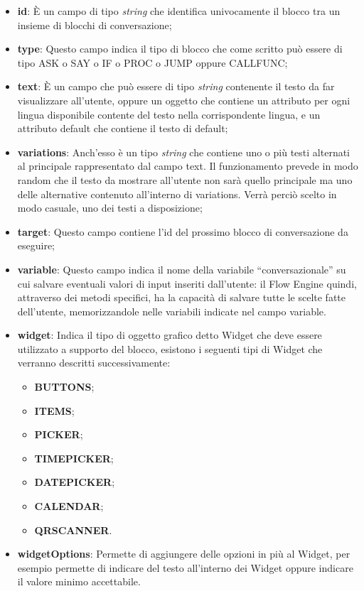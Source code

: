 \begin{itemize}
	\item \textbf{id}: È un campo di tipo \emph{string} che identifica univocamente il blocco tra un insieme di blocchi di conversazione;
	\item \textbf{type}: Questo campo indica il tipo di blocco che come scritto può essere di tipo ASK o SAY o IF o PROC o JUMP oppure CALLFUNC;        
	\item \textbf{text}: È un campo che può essere di tipo \emph{string} contenente il testo da far visualizzare all'utente, oppure un oggetto che contiene un attributo per ogni lingua disponibile contente del testo nella corrispondente lingua, e un attributo default che contiene il testo di default;
	\item \textbf{variations}: Anch'esso è un tipo \emph{string} che contiene uno o più testi alternati al principale rappresentato dal campo text. Il funzionamento prevede in modo random che il testo da mostrare all'utente non sarà quello principale ma uno delle alternative contenuto all'interno di variations. Verrà perciò scelto in modo casuale, uno dei testi a disposizione; 
	\item \textbf{target}: Questo campo contiene l'id del prossimo blocco di conversazione da eseguire;
	\item \textbf{variable}: Questo campo indica il nome della variabile “conversazionale” su cui salvare eventuali valori di input inseriti dall’utente: il Flow Engine quindi, attraverso dei metodi specifici, ha la capacità di salvare tutte le scelte fatte dell’utente, memorizzandole nelle variabili indicate nel campo variable.
	\item \textbf{widget}: Indica il tipo di oggetto grafico detto Widget che deve essere utilizzato a supporto del blocco, esistono i seguenti tipi di Widget che verranno descritti successivamente:
	\begin{itemize}
		\item \textbf{BUTTONS};
		\item \textbf{ITEMS};
		\item \textbf{PICKER};
		\item \textbf{TIMEPICKER};
		\item \textbf{DATEPICKER};
		\item \textbf{CALENDAR};
		\item \textbf{QRSCANNER}.
	\end{itemize}
	\item \textbf{widgetOptions}: Permette di aggiungere delle opzioni in più al Widget, per esempio permette di indicare del testo all'interno dei Widget oppure indicare il valore minimo accettabile.
\end{itemize} 

